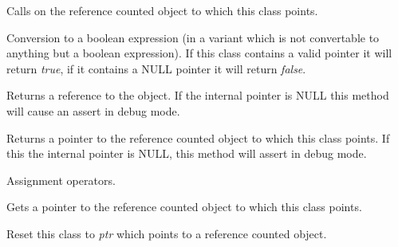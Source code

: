 \label{wxobjectdataptrdtor}


Calls  on the reference
counted object to which this class points.

\label{wxobjectdataptroperatorbool}


Conversion to a boolean expression (in a variant which is not 
convertable to anything but a boolean expression). If this class
contains a valid pointer it will return {\it true}, if it contains
a NULL pointer it will return {\it false}.

\label{wxobjectdataptroperatorreft}


Returns a reference to the object. If the internal pointer is NULL
this method will cause an assert in debug mode.

\label{wxobjectdataptroperatorpointer}


Returns a pointer to the reference counted object to which
this class points. If this the internal pointer is NULL,
this method will assert in debug mode.

\label{wxobjectdataptroperatorassign}



Assignment operators.

\label{wxobjectdataptrget}


Gets a pointer to the reference counted object to which
this class points.

\label{wxobjectdataptrreset}


Reset this class to {\it ptr} which points to a reference
counted object.
